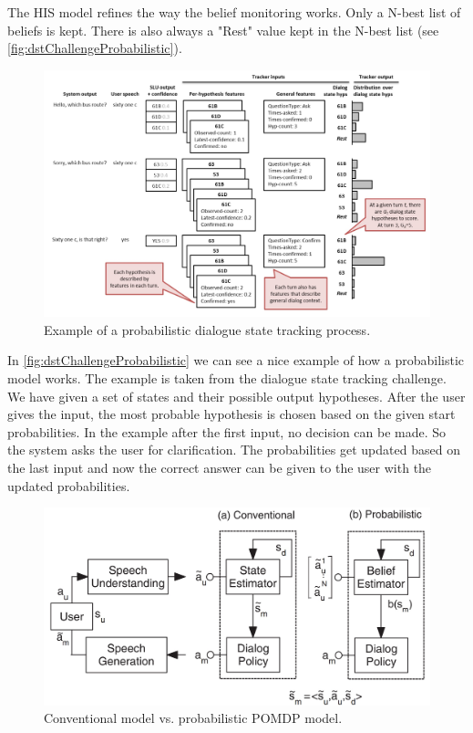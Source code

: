 \documentclass[conference]{IEEEtran}
\begin{document}
The HIS model refines the way the belief monitoring works. Only a N-best list of beliefs is kept. There is also always a "Rest" value kept in the N-best list (see \autoref{fig:dstChallengeProbabilistic})\cite{young2007hidden}.

\begin{figure}[H]
\centering
   \includegraphics[width=\linewidth]{dstChallangeProbabilistic.jpg}
  \caption{Example of a probabilistic dialogue state tracking process\cite{williams2013dialog}.}
  \label{fig:dstChallengeProbabilistic}
\end{figure}

In \autoref{fig:dstChallengeProbabilistic} we can see a nice example of how a probabilistic model works. The example is taken from the dialogue state tracking challenge\cite{williams2013dialog}. We have given a set of states and their possible output hypotheses.
After the user gives the input, the most probable hypothesis is chosen based on the given start probabilities. In the example after the first input, no decision can be made. So the system asks the user for clarification. The probabilities get updated based on the last input and now the correct answer can be given to the user with the updated probabilities. 


\begin{figure}[H]
\centering
   \includegraphics[width=\linewidth]{probabilisticVsConventionalModel.jpg}
  \caption{Conventional model vs. probabilistic POMDP model\cite{young2010hidden}.}
  \label{fig:pomdpVsConventional}
\end{figure}
\end{document}
